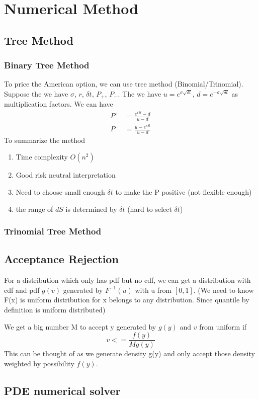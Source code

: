 \newpage
\section{Numerical Method}
\subsection{Tree Method}
\subsubsection{Binary Tree Method}
To price the American option, we can use tree method (Binomial/Trinomial). Suppose the we have $\sigma$, $r$, $\delta t$, $P_{+}$, $P_{-}$. The we have $u = e^{\sigma\sqrt{\delta t}}$, $d = e^{-\sigma\sqrt{\delta t}}$ as multiplication factors. We can have 
\begin{equation}
\begin{aligned}
P^+ &= \frac{e^{r\delta t} - d }{u-d} \\
P^- &= \frac{u - e^{r\delta t} }{u-d} 
\end{aligned}
\end{equation}
To summarize the method
\begin{enumerate}
\item Time complexity $O(n^2)$
\item Good risk neutral interpretation
\item Need to choose small enough $\delta t$ to make the P positive (not flexible enough)
\item the range of $dS$ is determined by $\delta t$ (hard to select $\delta t$)
\end{enumerate}
\subsubsection{Trinomial Tree Method}

\subsection{Acceptance Rejection}
For a distribution which only has pdf but no cdf, we can get a distribution with cdf and pdf $g(v)$ generated by $F^{-1}(u)$ with u from $[0, 1]$. {\color{blue} (We need to know F(x) is uniform distribution for x belongs to 
any distribution. Since quantile by definition is uniform distributed)}

We get a big number M to accept y generated by $g(y)$ and $v$ from uniform if 
$$
	v <= \frac{f(y)}{Mg(y)}
$$ 
This can be thought of as we generate density g(y) and only accept those density weighted by possibility $f(y)$.

\subsection{PDE numerical solver}
